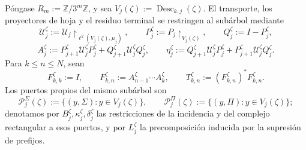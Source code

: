 Póngase \(R_m:=\mathbb Z/3^m\mathbb Z\), y sea
\(V_j(\zeta):=\operatorname{Desc}_{k,j}(\zeta)\). El transporte, los
proyectores de hoja y el residuo terminal se restringen al subárbol mediante
\[
 \mathcal U_j^\zeta:=
 \mathcal U_j\!\upharpoonright_{\ell^2(V_j(\zeta),\mu_j)},
 \qquad P_j^\zeta:=P_j\!\upharpoonright_{V_j(\zeta)},
 \qquad Q_j^\zeta:=I-P_j^\zeta,
\]
\[
 A_j^\zeta:=P_{j+1}^\zeta\mathcal U_j^\zeta P_j^\zeta
             +Q_{j+1}^\zeta\mathcal U_j^\zeta Q_j^\zeta,
 \qquad
 \eta_j^\zeta:=Q_{j+1}^\zeta\mathcal U_j^\zeta P_j^\zeta
             +P_{j+1}^\zeta\mathcal U_j^\zeta Q_j^\zeta.
\]
Para \(k\leq n\leq N\), sean
\[
 F_{k,k}^\zeta:=I,
 \qquad
 F_{k,n}^\zeta:=A_{n-1}^\zeta\cdots A_k^\zeta,
 \qquad
 T_{k,n}^\zeta:=(F_{k,n}^\zeta)^*F_{k,n}^\zeta.
\]
Los puertos propios del mismo subárbol son
\[
 \mathscr P_j^\Sigma(\zeta):=
 \{(y,\Sigma):y\in V_j(\zeta)\},
 \qquad
 \mathscr P_j^\Pi(\zeta):=
 \{(y,\Pi):y\in V_j(\zeta)\};
\]
denotamos por \(B_j^\zeta,\kappa_j^\zeta,\delta_j^\zeta\) las restricciones
de la incidencia y del complejo rectangular a esos puertos, y por
\(L_j^\zeta\) la precomposición inducida por la supresión de prefijos.

